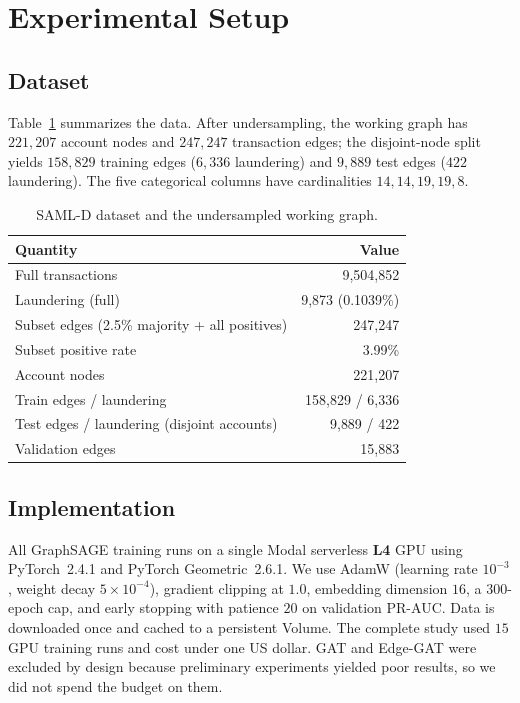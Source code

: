 \documentclass[conference]{IEEEtran}
\begin{document}
\section{Experimental Setup}
\label{sec:setup}
\subsection{Dataset}
Table~\ref{tab:data} summarizes the data. After undersampling, the working graph has $221{,}207$ account
nodes and $247{,}247$ transaction edges; the disjoint-node split yields $158{,}829$ training edges
($6{,}336$ laundering) and $9{,}889$ test edges ($422$ laundering). The five categorical columns have
cardinalities $14, 14, 19, 19, 8$.

\begin{table}[t]
\caption{SAML-D dataset and the undersampled working graph.}
\label{tab:data}
\centering
\begin{tabular}{lr}
\toprule
Quantity & Value \\
\midrule
Full transactions & 9{,}504{,}852 \\
Laundering (full) & 9{,}873 (0.1039\%) \\
Subset edges (2.5\% majority + all positives) & 247{,}247 \\
Subset positive rate & 3.99\% \\
Account nodes & 221{,}207 \\
Train edges / laundering & 158{,}829 / 6{,}336 \\
Test edges / laundering (disjoint accounts) & 9{,}889 / 422 \\
Validation edges & 15{,}883 \\
\bottomrule
\end{tabular}
\end{table}

\subsection{Implementation}
All GraphSAGE training runs on a single Modal serverless \textbf{L4} GPU using PyTorch~2.4.1 and PyTorch
Geometric~2.6.1. We use AdamW (learning rate $10^{-3}$, weight decay $5\times10^{-4}$), gradient clipping
at $1.0$, embedding dimension $16$, a $300$-epoch cap, and early stopping with patience $20$ on validation
PR-AUC. Data is downloaded once and cached to a persistent Volume. The complete study used $15$ GPU
training runs and cost under one US dollar. GAT and Edge-GAT were excluded by design because preliminary
experiments yielded poor results, so we did not spend the budget on them.
\end{document}
